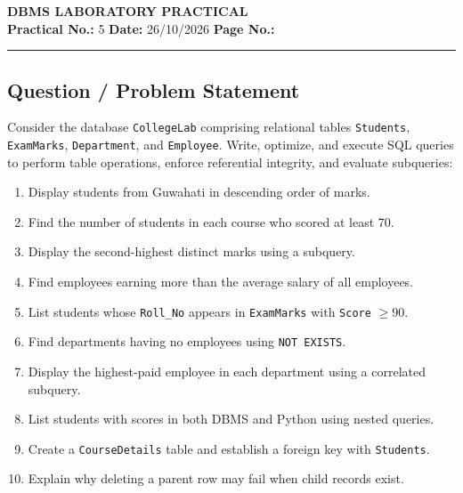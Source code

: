\label{exp:nested_queries_practice}
\label{exp:practical_05}
\noindent
\begin{center}
    {\LARGE \textbf{DBMS LABORATORY PRACTICAL}}\\[0.25cm]
    \textbf{Practical No.:} 5 \hfill \textbf{Date:} 26/10/2026 \hfill \textbf{Page No.:} \thepage
\end{center}
\vspace{-0.3cm}
\hrule
\vspace{0.2cm}

\subsection*{Question / Problem Statement}
Consider the database \texttt{CollegeLab} comprising relational tables \texttt{Students}, \texttt{ExamMarks}, \texttt{Department}, and \texttt{Employee}. Write, optimize, and execute SQL queries to perform table operations, enforce referential integrity, and evaluate subqueries:
\begin{enumerate}[noitemsep,topsep=1pt,parsep=0pt,partopsep=0pt]
    \item[(i)] Display students from Guwahati in descending order of marks.
    \item[(ii)] Find the number of students in each course who scored at least 70.
    \item[(iii)] Display the second-highest distinct marks using a subquery.
    \item[(iv)] Find employees earning more than the average salary of all employees.
    \item[(v)] List students whose \texttt{Roll\_No} appears in \texttt{ExamMarks} with \texttt{Score} $\ge 90$.
    \item[(vi)] Find departments having no employees using \texttt{NOT EXISTS}.
    \item[(vii)] Display the highest-paid employee in each department using a correlated subquery.
    \item[(viii)] List students with scores in both DBMS and Python using nested queries.
    \item[(ix)] Create a \texttt{CourseDetails} table and establish a foreign key with \texttt{Students}.
    \item[(x)] Explain why deleting a parent row may fail when child records exist.
\end{enumerate}


